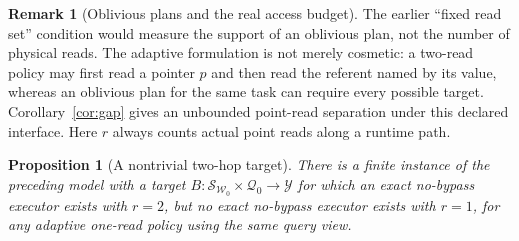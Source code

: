 \documentclass[11pt]{article}
\theoremstyle{definition}
\newtheorem{remark}{Remark}
\theoremstyle{plain}
\newtheorem{proposition}{Proposition}
\newcommand{\Wr}{\mathcal{W}}
\newcommand{\Qu}{\mathcal{Q}}
\begin{document}
\begin{remark}[Oblivious plans and the real access budget]
The earlier ``fixed read set'' condition would measure the support of an
oblivious plan, not the number of physical reads.
The adaptive formulation is not merely cosmetic: a two-read policy may first
read a pointer \(p\) and then read the referent named by its value, whereas
an oblivious plan for the same task can require every possible target.
Corollary~\ref{cor:gap} gives an unbounded point-read separation under this
declared interface.  Here \(r\) always counts actual point reads along a
runtime path.
\end{remark}

\begin{proposition}[A nontrivial two-hop target]\label{prop:twohop}
There is a finite instance of the preceding model with a target
\(B:\mathcal S_{\Wr_0}\times\Qu_0\to\mathcal Y\) for which an exact
no-bypass executor exists with \(r=2\), but no exact no-bypass executor
exists with \(r=1\), for any adaptive one-read policy using the same query
view.
\end{proposition}
\end{document}
